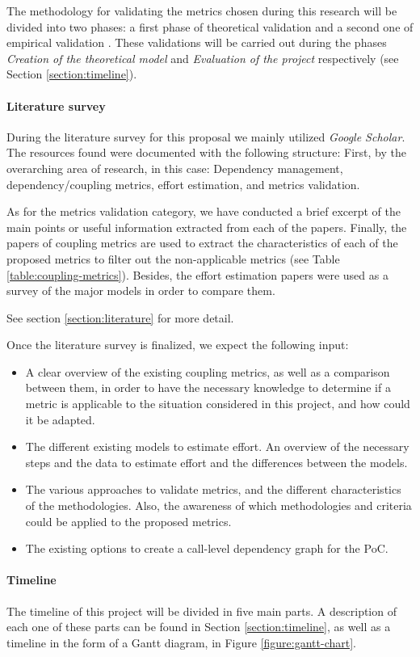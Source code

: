 \bigskip\noindent
The methodology for validating the metrics chosen during this research will be divided into two phases: a first phase of theoretical validation and a second one of empirical validation \cite{srinivasan2014software}.
These validations will be carried out during the phases \textit{Creation of the theoretical model} and \textit{Evaluation of the project} respectively (see Section \ref{section:timeline}).

\paragraph{Literature survey}
During the literature survey for this proposal we mainly utilized \textit{Google Scholar}. The resources found were documented with the following structure: First, by the overarching area of research, in this case: Dependency management, dependency/coupling metrics, effort estimation, and metrics validation.

As for the metrics validation category, we have conducted a brief excerpt of the main points or useful information extracted from each of the papers.
Finally, the papers of coupling metrics are used to extract the characteristics of each of the proposed metrics to filter out the non-applicable metrics (see Table \ref{table:coupling-metrics}). Besides, the effort estimation papers were used as a survey of the major models in order to compare them.

See section \ref{section:literature} for more detail.

\bigskip\noindent
Once the literature survey is finalized, we expect the following input:

\begin{itemize}
  \item A clear overview of the existing coupling metrics, as well as a comparison between them, in order to have the necessary knowledge to determine if a metric is applicable to the situation considered in this project, and how could it be adapted.

  \item The different existing models to estimate effort. An overview of the necessary steps and the data to estimate effort and the differences between the models.

  \item The various approaches to validate metrics, and the different characteristics of the methodologies. Also, the awareness of which methodologies and criteria could be applied to the proposed metrics.

  \item The existing options to create a call-level dependency graph for the PoC.
\end{itemize}

\paragraph{Timeline}
The timeline of this project will be divided in five main parts. A description of each one of these parts can be found in Section \ref{section:timeline}, as well as a timeline in the form of a Gantt diagram, in Figure \ref{figure:gantt-chart}.
